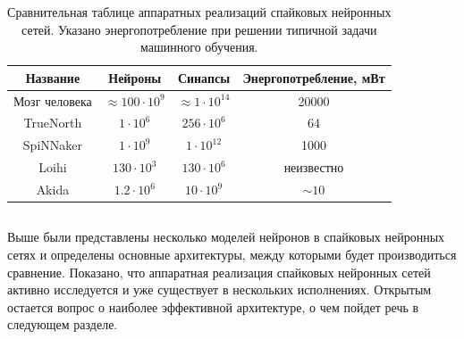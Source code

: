 \documentclass[a4paper]{article}
\begin{document}
\begin{table}[h]
 \caption {Сравнительная таблице аппаратных реализаций спайковых нейронных сетей. Указано энергопотребление при решении типичной задачи машинного обучения.}
 \begin{center}
  \begin{tabular}{|c|c|c|c|}
  \hline
  {Название} & {Нейроны} & {Синапсы} & {Энергопотребление, мВт}\\
  \hline
  {Мозг человека} & {$\approx 100 \cdot 10^9$} & {$\approx 1 \cdot 10^{14}$} & {20000}\\
  \hline
  {TrueNorth \cite{TrueNorth}} & {$1 \cdot 10^6$} & {$256 \cdot 10^6$} & {64\footnotemark[1]}\\
  \hline
  {SpiNNaker \cite{SpiNNaker}} & {$1 \cdot 10^9$} & {$1 \cdot 10^{12}$} & {1000\footnotemark[2]}\\
  \hline
  {Loihi \cite{Loihi}} & {$130 \cdot 10^3$} & {$130 \cdot 10^{6}$} & {неизвестно}\\
  \hline
  {Akida \cite{Akida}} & {$1.2 \cdot 10^6$} & {$10 \cdot 10^{9}$} & {$\sim 10$ \footnotemark[3]}\\
  \hline 
  \end{tabular}
 \end{center}
\end{table}


\subsection{} 
Выше были представлены несколько моделей нейронов в спайковых нейронных сетях и определены основные архитектуры, между которыми будет производиться сравнение. Показано, что аппаратная реализация спайковых нейронных сетей активно исследуется и уже существует в нескольких исполнениях. Открытым остается вопрос о наиболее эффективной архитектуре, о чем пойдет речь в следующем разделе.

\clearpage

\section{}
\end{document}
